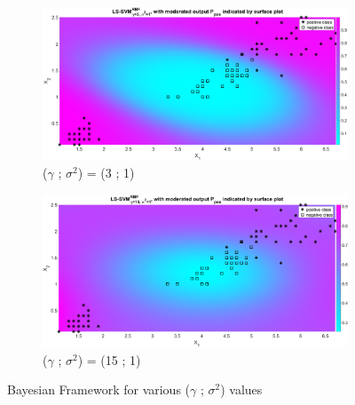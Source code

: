 \documentclass[12pt]{report}
\begin{document}
{\begin{figure}[!htbp]
\begin{subfigure}{.33\textwidth}
		\centering
		\includegraphics[height=0.8\linewidth,width=1\linewidth]{Ex1.3.4_gam3_sig1.eps}
		\caption{($\gamma$ ; $\sigma^2$) = (3 ; 1)}
		\label{fig:gam3_sig1}
	\end{subfigure}%
	\begin{subfigure}{.33\textwidth}
		\centering
		\includegraphics[height=0.8\linewidth,width=1\linewidth]{Ex1.3.4_gam15_sig1.eps}
		\caption{($\gamma$ ; $\sigma^2$) = (15 ; 1)}
		\label{fig:gam15_sig1}
	\end{subfigure}%
	\caption{Bayesian Framework for various ($\gamma$ ; $\sigma^2$) values}
	\label{fig:bayes}
\end{figure}
}
\end{document}
